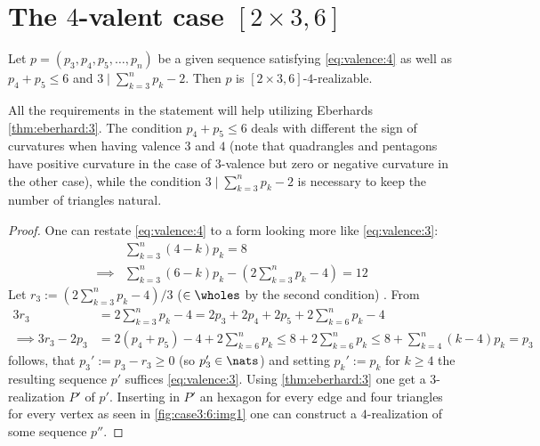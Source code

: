 \section{The $4$-valent case $[2 \times 3, 6]$}
\begin{lemma}\label{thm:case3:6:mainlemma}
  Let $p = (p_3, p_4, p_5, \dots, p_n)$ be a given sequence satisfying \autoref{eq:valence:4} as well as $p_4 + p_5 \leq 6$ and $3 \mid \sum_{k=3}^{n} p_k - 2$. Then $p$ is $[2 \times 3, 6]$-$4$-realizable.

  All the requirements in the statement will help utilizing Eberhards \autoref{thm:eberhard:3}. The condition $p_4 + p_5 \leq 6$ deals with different the sign of curvatures when having valence $3$ and $4$ (note that quadrangles and pentagons have positive curvature in the case of $3$-valence but zero or negative curvature in the other case), while the condition $3 \mid \sum_{k=3}^{n} p_k - 2$ is necessary to keep the number of triangles natural. 
  \begin{proof}
    One can restate \autoref{eq:valence:4} to a form looking more like \autoref{eq:valence:3}:
    \begin{align*}
      & \sum_{k=3}^n \left( 4 - k \right) p_k = 8 \\
      \implies & \sum_{k=3}^n \left( 6 - k \right) p_k - \left(2 \sum_{k=3}^n  p_k - 4 \right) = 12
    \end{align*}
    Let $r_3 := (2 \sum_{k=3}^{n} p_k - 4)/3$ ($\in \wholes$ by the second condition) . From
    \begin{align*}
      3 r_3 &= 2 \sum_{k=3}^{n} p_k - 4 =  2 p_3 + 2 p_4 + 2 p_5 + 2 \sum_{k=6}^{n} p_k - 4\\
      \implies 3 r_3 - 2 p_3 &= 2(p_4 + p_5) - 4 + 2 \sum_{k=6}^{n} p_k \leq 8 + 2 \sum_{k=6}^{n} p_k \leq 8 + \sum_{k=4}^{n} (k - 4) p_k = p_3
    \end{align*}
    follows, that $p_3' := p_3 - r_3 \geq 0$ (so $p'_3 \in \nats$) and setting $p_k' := p_k$ for $k \geq 4$ the resulting sequence $p'$ suffices \autoref{eq:valence:3}. Using \autoref{thm:eberhard:3} one get a $3$-realization $P'$ of $p'$. Inserting in $P'$ an hexagon for every edge and four triangles for every vertex as seen in \autoref{fig:case3:6:img1} one can construct a $4$-realization of some sequence $p''$.
    

\end{proof}
\end{lemma}
